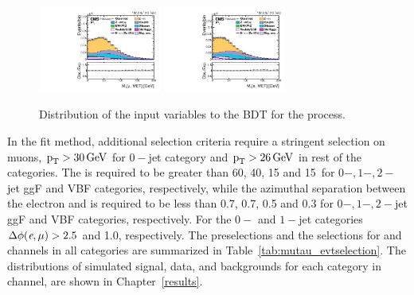 \begin{figure}[htbp!]
  \includegraphics[width=0.36\textwidth]{plots/chapter6/mue/MTMuMET.pdf}
  \includegraphics[width=0.36\textwidth]{plots/chapter6/mue/MTEMET.pdf}\\
  \caption{Distribution of the input variables to the BDT for the \mue process.}
  \label{fig:input_me}
\end{figure}

In the \mcol fit method, additional selection criteria require a stringent selection on muons, $\text{p}_\text{T} > 30 \,\text{Ge\hspace{-.08em}V}$ for $0-$jet category and $\text{p}_\text{T} > 26 \,\text{Ge\hspace{-.08em}V}$ in rest of the categories. The \mtmmet is required to be greater than 60, 40, 15 and 15~\GeV for $0-, 1-, 2-$jet ggF and VBF categories, respectively, while the azimuthal separation between the electron and \ptvecmiss is required to be less than 0.7, 0.7, 0.5 and 0.3 for $0-, 1-, 2-$jet ggF and VBF categories, respectively. For the $0-$ and $1-$jet categories $\Delta\phi(\textit{e},\mu) > 2.5$ and 1.0, respectively. The preselections and the selections for \muhad and \mue channels in all categories are summarized in Table~\ref{tab:mutau_evtselection}. The \mcol distributions of simulated signal, data, and backgrounds for each category in \mue channel, are shown in Chapter~\ref{results}.

